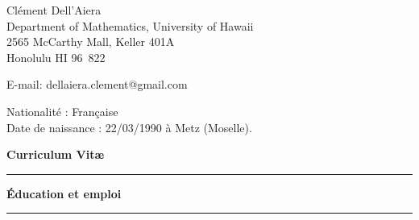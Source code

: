 \documentclass[a4paper,11pt]{article}
\newcommand{\titre}[1]{%
	\begin{center}
	\bigskip
	\rule{\textwidth}{1pt}
	\par\vspace{0.1cm}
        \textbf{\large #1}
	\par\rule{\textwidth}{1pt}
	\end{center}
	\bigskip
	}
\begin{document}
\begin{flushleft}
Clément Dell'Aiera \\
Department of Mathematics, University of Hawaii\\
2565 McCarthy Mall, Keller 401A \\
Honolulu HI 96\ 822 \\

\medskip

E-mail: dellaiera.clement@gmail.com


\end{flushleft}
\begin{flushleft}
Nationalit\'e : Fran\c{c}aise \\
Date de naissance : 22/03/1990 \`a Metz (Moselle).
\end{flushleft}

\vspace{1.5cm}
\begin{center}
\par\huge{\textbf{Curriculum Vit\ae} }
\end{center}

\titre{\'Education et emploi}
\end{document}
